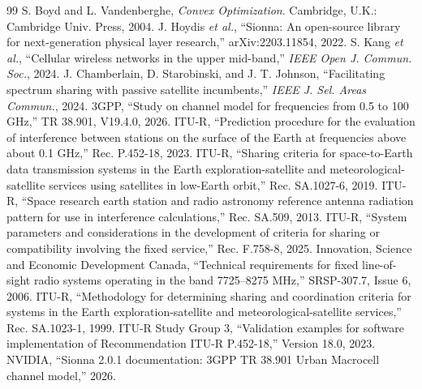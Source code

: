 \begin{thebibliography}{99}
 S. Boyd and L. Vandenberghe, \emph{Convex Optimization}. Cambridge, U.K.: Cambridge Univ. Press, 2004.
 J. Hoydis \emph{et al.}, ``Sionna: An open-source library for next-generation physical layer research,'' arXiv:2203.11854, 2022.
 S. Kang \emph{et al.}, ``Cellular wireless networks in the upper mid-band,'' \emph{IEEE Open J. Commun. Soc.}, 2024.
 J. Chamberlain, D. Starobinski, and J. T. Johnson, ``Facilitating spectrum sharing with passive satellite incumbents,'' \emph{IEEE J. Sel. Areas Commun.}, 2024.
 3GPP, ``Study on channel model for frequencies from 0.5 to 100 GHz,'' TR 38.901, V19.4.0, 2026.
 ITU-R, ``Prediction procedure for the evaluation of interference between stations on the surface of the Earth at frequencies above about 0.1 GHz,'' Rec. P.452-18, 2023.
 ITU-R, ``Sharing criteria for space-to-Earth data transmission systems in the Earth exploration-satellite and meteorological-satellite services using satellites in low-Earth orbit,'' Rec. SA.1027-6, 2019.
 ITU-R, ``Space research earth station and radio astronomy reference antenna radiation pattern for use in interference calculations,'' Rec. SA.509, 2013.
 ITU-R, ``System parameters and considerations in the development of criteria for sharing or compatibility involving the fixed service,'' Rec. F.758-8, 2025.
 Innovation, Science and Economic Development Canada, ``Technical requirements for fixed line-of-sight radio systems operating in the band 7725--8275 MHz,'' SRSP-307.7, Issue 6, 2006.
 ITU-R, ``Methodology for determining sharing and coordination criteria for systems in the Earth exploration-satellite and meteorological-satellite services,'' Rec. SA.1023-1, 1999.
 ITU-R Study Group 3, ``Validation examples for software implementation of Recommendation ITU-R P.452-18,'' Version 18.0, 2023.
 NVIDIA, ``Sionna 2.0.1 documentation: 3GPP TR 38.901 Urban Macrocell channel model,'' 2026.
\end{thebibliography}
